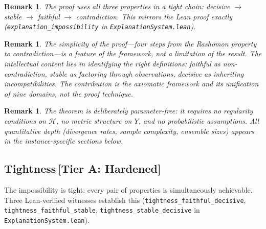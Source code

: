 \documentclass[11pt,a4paper]{article}
\newtheorem{remark}[theorem]{Remark}
\newcommand{\sH}{\mathcal{H}}
\begin{document}
\begin{remark}
The proof uses all three properties in a tight chain:
decisive $\to$ stable $\to$ faithful $\to$ contradiction.
This mirrors the Lean proof exactly (\texttt{explanation\_impossibility} in
\texttt{ExplanationSystem.lean}).
\end{remark}

\begin{remark}
The simplicity of the proof---four steps from the Rashomon
property to contradiction---is a feature of the framework, not a
limitation of the result.  The intellectual content lies in identifying the
right definitions: faithful as non-contradiction, stable as factoring
through observations, decisive as inheriting incompatibilities.  The
contribution is the axiomatic framework and its unification of nine
domains, not the proof technique.
\end{remark}

\begin{remark}
The theorem is deliberately parameter-free: it requires no regularity
conditions on $\sH$, no metric structure on $Y$, and no probabilistic
assumptions.  All quantitative depth (divergence rates, sample complexity,
ensemble sizes) appears in the instance-specific sections below.
\end{remark}

\subsection{Tightness\,\textnormal{\normalsize[Tier A: Hardened]}}
\label{sec:tightness}

The impossibility is tight: every pair of properties is simultaneously
achievable.  Three Lean-verified witnesses establish this
(\texttt{tightness\_faithful\_decisive},
\texttt{tightness\_faithful\_stable},
\texttt{tightness\_stable\_decisive} in \texttt{ExplanationSystem.lean}).
\end{document}
